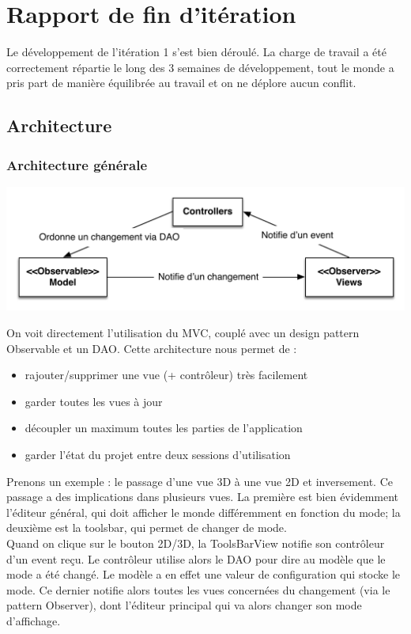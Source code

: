 \section{Rapport de fin d'itération}

Le développement de l'itération 1 s'est bien déroulé. La charge de travail a 
été correctement répartie le long des 3 semaines de développement, tout le monde
a pris part de manière équilibrée au travail et on ne déplore aucun conflit.\\

\subsection{Architecture}

	\subsubsection{Architecture générale}
	\includegraphics{uml/general-architecture.pdf}

	On voit directement l'utilisation du MVC, couplé avec un design pattern
	Observable et un DAO. Cette architecture nous permet de :
	\begin{itemize}
		\item rajouter/supprimer une vue (+ contrôleur) très facilement
		\item garder toutes les vues à jour
		\item découpler un maximum toutes les parties de l'application
		\item garder l'état du projet entre deux sessions d'utilisation
	\end{itemize}

	Prenons un exemple : le passage d'une vue 3D à une vue 2D et inversement.
	Ce passage a des implications dans plusieurs vues. La première est
	bien évidemment l'éditeur général, qui doit afficher le monde différemment
	en fonction du mode; la deuxième est la toolsbar, qui permet de changer de
	mode.\\

	Quand on clique sur le bouton 2D/3D, la ToolsBarView notifie son contrôleur
	d'un event reçu. Le contrôleur utilise alors le DAO pour dire au modèle que
	le mode a été changé. Le modèle a en effet une valeur de configuration qui
	stocke le mode. Ce dernier notifie alors toutes les vues concernées du 
	changement (via le pattern Observer), dont l'éditeur principal qui va alors
	changer son mode d'affichage.\\

